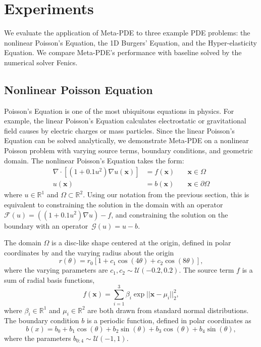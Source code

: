 \section{Experiments}
We evaluate the application of Meta-PDE to three example PDE problems: the nonlinear Poisson's Equation, the 1D Burgers’ Equation, and the Hyper-elasticity Equation. We compare Meta-PDE's performance with baseline solved by the numerical solver Fenics.
\subsection{Nonlinear Poisson Equation}
Poisson's Equation is one of the most ubiquitous equations in physics. For example, the linear Poisson's Equation calculates electrostatic or gravitational field causes by electric charges or mass particles. Since the linear Poisson's Equation can be solved analytically, we demonstrate Meta-PDE on a nonlinear Poisson problem with varying source terms, boundary conditions, and geometric domain. The nonlinear Poisson's Equation takes the form:
\begin{align*}
\nabla \cdot \left[ (1 + 0.1 u^2) \nabla u(\bm{x}) \right]&= f(\bm{x}) \quad &\bm{x} \in \Omega\\
u(\bm{x}) &= b(\bm{x}) \quad &\bm{x} \in \partial\Omega
\end{align*}
where $u \in \mathbb{R}^1$ and $\Omega \subset \mathbb{R}^2$. Using our notation from the previous section, this is equivalent to constraining the solution in the domain with an operator~${\mathcal{F}(u) = ((1 + 0.1 u^2) \nabla u) - f}$, and constraining the solution on the boundary with an operator~${\mathcal{G}(u) = u - b}$.

The domain $\Omega$ is a disc-like shape centered at the origin, defined in polar coordinates by  and the varying radius about the origin
\[
r(\theta) = r_0[1 + c_1 \cos(4\theta) + c_2 \cos(8\theta)],
\]
where the varying parameters are $c_1, c_2 \sim \mathcal{U}(-0.2, 0.2)$. The source term $f$ is a sum of radial basis functions,
\[
f(\bm{x}) = \sum_{i=1}^3 \beta_i \exp{||\bm{x} - \mu_i||_2^2},
\]
where $\beta_i \in \mathbb{R}^1$ and $\mu_i \in \mathbb{R}^2$ are both drawn from standard normal distributions. The boundary condition $b$ is a periodic function, defined in polar coordinates as
\[
b(x) = b_0 + b_1 \cos(\theta) + b_2 \sin(\theta) + b_3 \cos(\theta) + b_4 \sin(\theta),
\]
where the parameters $b_{0:4} \sim \mathcal{U}(-1, 1)$.

